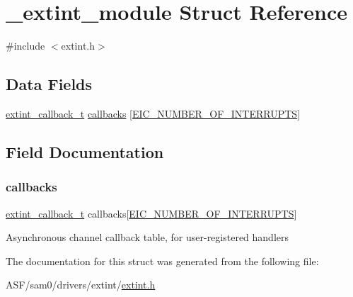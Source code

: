 \hypertarget{struct__extint__module}{}\section{\+\_\+extint\+\_\+module Struct Reference}
\label{struct__extint__module}


{\ttfamily \#include $<$extint.\+h$>$}

\subsection*{Data Fields}
\begin{DoxyCompactItemize}
\item 
\mbox{\hyperlink{group__asfdoc__sam0__extint__group_ga0faa88198c196060baeecb40061daaa5}{extint\+\_\+callback\+\_\+t}} \mbox{\hyperlink{struct__extint__module_ada1566549049386ed8066c22f2def4b7}{callbacks}} \mbox{[}\mbox{\hyperlink{group__asfdoc__sam0__extint__group_ga4388f6f166f07c60940ec351a8eb1bac}{E\+I\+C\+\_\+\+N\+U\+M\+B\+E\+R\+\_\+\+O\+F\+\_\+\+I\+N\+T\+E\+R\+R\+U\+P\+TS}}\mbox{]}
\end{DoxyCompactItemize}


\subsection{Field Documentation}
\mbox{\label{struct__extint__module_ada1566549049386ed8066c22f2def4b7}} 
\subsubsection{\texorpdfstring{callbacks}{callbacks}}
{\footnotesize\ttfamily \mbox{\hyperlink{group__asfdoc__sam0__extint__group_ga0faa88198c196060baeecb40061daaa5}{extint\+\_\+callback\+\_\+t}} callbacks\mbox{[}\mbox{\hyperlink{group__asfdoc__sam0__extint__group_ga4388f6f166f07c60940ec351a8eb1bac}{E\+I\+C\+\_\+\+N\+U\+M\+B\+E\+R\+\_\+\+O\+F\+\_\+\+I\+N\+T\+E\+R\+R\+U\+P\+TS}}\mbox{]}}

Asynchronous channel callback table, for user-\/registered handlers 

The documentation for this struct was generated from the following file\+:\begin{DoxyCompactItemize}
\item 
A\+S\+F/sam0/drivers/extint/\mbox{\hyperlink{extint_8h}{extint.\+h}}\end{DoxyCompactItemize}

